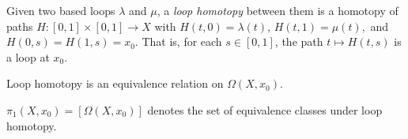 \label{loophomotopy}
Given two based loops $\lambda$ and $\mu$, a \emph{loop homotopy} between them is a homotopy of paths $H : [0,1] \times [0,1] \rightarrow X$ with
$H(t,0) = \lambda(t), \, H(t,1) = \mu(t),$ and $H(0,s) = H(1,s) = x_0$. That is, for each $s \in [0,1]$, the path $t \mapsto H(t,s)$ is a loop at $x_0$.

\begin{theorem}
Loop homotopy is an equivalence relation on $\Omega(X,x_0)$.
\end{theorem}

\noindent $\pi_1(X, x_0) = [\Omega(X,x_0)]$ denotes the set of equivalence classes under loop homotopy.